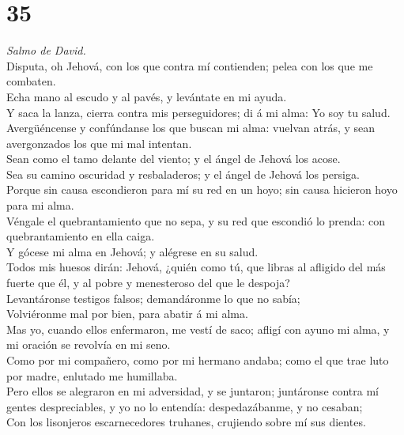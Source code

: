 \hypertarget{section-34}{%
\section{35}\label{section-34}}

 \emph{Salmo de David.}\\
Disputa, oh Jehová, con los que contra mí contienden; pelea con los que
me combaten.\\
 Echa mano al escudo y al pavés, y levántate en mi ayuda.\\
 Y saca la lanza, cierra contra mis perseguidores; di á mi
alma: Yo soy tu salud.\\
 Avergüéncense y confúndanse los que buscan mi alma: vuelvan
atrás, y sean avergonzados los que mi mal intentan.\\
 Sean como el tamo delante del viento; y el ángel de Jehová
los acose.\\
 Sea su camino oscuridad y resbaladeros; y el ángel de
Jehová los persiga.\\
 Porque sin causa escondieron para mí su red en un hoyo; sin
causa hicieron hoyo para mi alma.\\
 Véngale el quebrantamiento que no sepa, y su red que
escondió lo prenda: con quebrantamiento en ella caiga.\\
 Y gócese mi alma en Jehová; y alégrese en su salud.\\
 Todos mis huesos dirán: Jehová, ¿quién como tú, que libras
al afligido del más fuerte que él, y al pobre y menesteroso del que le
despoja?\\
 Levantáronse testigos falsos; demandáronme lo que no
sabía;\\
 Volviéronme mal por bien, para abatir á mi alma.\\
 Mas yo, cuando ellos enfermaron, me vestí de saco; afligí
con ayuno mi alma, y mi oración se revolvía en mi seno.\\
 Como por mi compañero, como por mi hermano andaba; como el
que trae luto por madre, enlutado me humillaba.\\
 Pero ellos se alegraron en mi adversidad, y se juntaron;
juntáronse contra mí gentes despreciables, y yo no lo entendía:
despedazábanme, y no cesaban;\\
 Con los lisonjeros escarnecedores truhanes, crujiendo
sobre mí sus dientes.\\
